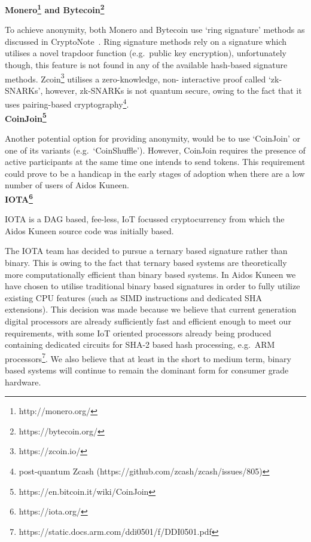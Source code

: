 \documentclass[a4paper,10pt,twocolumn]{article}
\begin{document}
{\bf Monero\footnote{http://monero.org/} and Bytecoin\footnote{https://bytecoin.org/}}

To achieve anonymity, both Monero and Bytecoin use `ring signature' methods as discussed in CryptoNote~\cite{ringsig}. Ring signature 
methods rely on a signature which utilises a novel trapdoor function (e.g.\ public key encryption), unfortunately though, this feature is 
not found in any of the available hash-based signature methods. Zcoin\footnote{https://zcoin.io/} utilises a zero-knowledge, non-
interactive proof called `zk-SNARKs', however, zk-SNARKs is not quantum secure, owing to the fact that it uses pairing-based 
cryptography\footnote{post-quantum Zcash (https://github.com/zcash/zcash/issues/805)}. 
\\

\noindent
{\bf CoinJoin\footnote{https://en.bitcoin.it/wiki/CoinJoin}}

Another potential option for providing anonymity, would be to use `CoinJoin' or one of its variants (e.g.\ `CoinShuffle'). However, 
CoinJoin requires the presence of active participants at the same time one intends to send tokens. This requirement could prove to be a 
handicap in the early stages of adoption when there are a low number of users of Aidos Kuneen. 
\\

\noindent
{\bf IOTA\footnote{https://iota.org/}}

IOTA is a DAG based, fee-less, IoT focussed cryptocurrency from which the Aidos Kuneen source code was initially based. 

The IOTA team has decided to pursue a ternary based signature rather than binary. This is owing to the fact that ternary based 
systems are theoretically more computationally efficient than binary based systems. In Aidos Kuneen we have chosen to utilise 
traditional binary based signatures in order to fully utilize existing CPU features (such as SIMD instructions and dedicated SHA 
extensions). This decision was made because we believe that current generation digital processors are already sufficiently fast and 
efficient enough to meet our requirements, with some IoT oriented processors already being produced containing dedicated circuits for 
SHA-2 based hash processing, e.g.~ARM processors\footnote{https://static.docs.arm.com/ddi0501/f/DDI0501.pdf}. We also believe that at 
least in the short to medium term, binary based systems will continue to remain the dominant form for consumer grade hardware.
\end{document}
